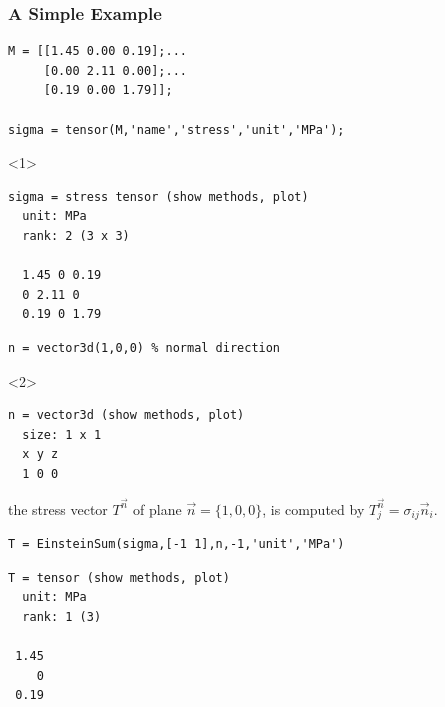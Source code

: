 \begin{frame}[fragile]
  \frametitle{A Simple Example}


  \begin{lstlisting}
M = [[1.45 0.00 0.19];...
     [0.00 2.11 0.00];...
     [0.19 0.00 1.79]];

sigma = tensor(M,'name','stress','unit','MPa');
\end{lstlisting}
\begin{onlyenv}<1>
  \begin{lstlisting}[style=output]
sigma = stress tensor (show methods, plot)
  unit: MPa
  rank: 2 (3 x 3)

  1.45 0 0.19
  0 2.11 0
  0.19 0 1.79
  \end{lstlisting}
\end{onlyenv}

\pause
\medskip

\begin{lstlisting}
n = vector3d(1,0,0) % normal direction
\end{lstlisting}
\begin{onlyenv}<2>
  \begin{lstlisting}[style=output]
n = vector3d (show methods, plot)
  size: 1 x 1
  x y z
  1 0 0
  \end{lstlisting}
\end{onlyenv}

\pause
\medskip

the stress vector $T^{\vec n}$ of plane $\vec n = \{1,0,0\}$, is computed by
$T^{\vec n}_{j} = \sigma_{ij} \vec n_{i}.$

\pause
\medskip

\begin{lstlisting}
T = EinsteinSum(sigma,[-1 1],n,-1,'unit','MPa')
\end{lstlisting}
\begin{lstlisting}[style=output]
T = tensor (show methods, plot)
  unit: MPa
  rank: 1 (3)

 1.45
    0
 0.19
\end{lstlisting}


\end{frame}



